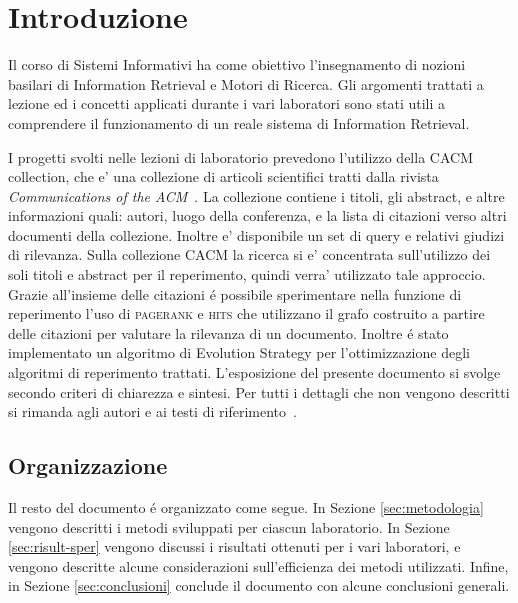 \section{Introduzione}
\label{sec:introduzione}

Il corso di Sistemi Informativi ha come obiettivo l'insegnamento di nozioni basilari di Information Retrieval e Motori di Ricerca. Gli argomenti trattati a lezione ed i concetti applicati durante i vari laboratori sono stati utili a comprendere il funzionamento di un reale sistema di Information Retrieval.

I progetti svolti nelle lezioni di laboratorio prevedono l'utilizzo della CACM collection, che e' una collezione di articoli scientifici tratti dalla rivista \textit{Communications of the ACM}~\cite{ACMCollection}. La collezione contiene i titoli, gli abstract, e altre informazioni quali: autori, luogo della conferenza, e la lista di citazioni verso altri documenti della collezione. Inoltre e' disponibile un set di query e relativi giudizi di rilevanza. Sulla collezione CACM la ricerca si e' concentrata sull'utilizzo dei soli titoli e abstract per il reperimento, quindi verra' utilizzato tale approccio. Grazie all'insieme delle citazioni \'e possibile sperimentare nella funzione di reperimento l'uso di \textsc{pagerank} e \textsc{hits} che utilizzano il grafo costruito a partire delle citazioni per valutare la rilevanza di un documento. Inoltre \'e stato implementato un algoritmo di Evolution Strategy per l'ottimizzazione degli algoritmi di reperimento trattati. L'esposizione del presente documento si svolge secondo criteri di chiarezza e sintesi. Per tutti i dettagli che non vengono descritti si rimanda agli autori e ai testi di riferimento~\cite{manning2008introduction,melucci2013information,croft2010search}.
\subsection{Organizzazione}
Il resto del documento \'e organizzato come segue. In Sezione \ref{sec:metodologia} vengono descritti i metodi sviluppati per ciascun laboratorio. In Sezione \ref{sec:risult-sper} vengono discussi i risultati ottenuti per i vari laboratori, e vengono descritte alcune considerazioni sull'efficienza dei metodi utilizzati. Infine, in Sezione \ref{sec:conclusioni} conclude il documento con alcune conclusioni generali.

%
